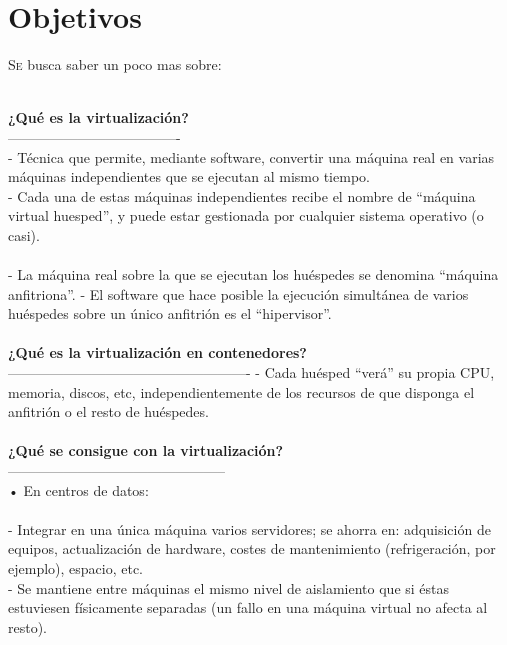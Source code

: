 \documentclass[twoside,twocolumn]{article}
\begin{document}
\section{Objetivos}
\begin{flushright}
\begin{itemize}
\lettrine[nindent=0em,lines=2]{S}e busca saber un poco mas sobre:

\textbf{}\\
\textbf{¿Qué es la virtualización?}\\
-------------------------------------
\textbf{}\\
- Técnica que permite, mediante software, convertir una máquina
real en varias máquinas independientes que se ejecutan al mismo
tiempo.\textbf{}\\
- Cada una de estas máquinas independientes recibe el nombre de
“máquina virtual huesped”, y puede estar gestionada por
cualquier sistema operativo (o casi).\textbf{}\\
\textbf{}\\
- La máquina real sobre la que se ejecutan los huéspedes se
denomina “máquina anfitriona”.
- El software que hace posible la ejecución simultánea de varios
huéspedes sobre un único anfitrión es el “hipervisor”.
\textbf{}\\
\textbf{}\\
\textbf{¿Qué es la virtualización en contenedores?}\\
----------------------------------------------------
- Cada huésped “verá” su propia CPU, memoria, discos, etc,
independientemente de los recursos de que disponga el anfitrión
o el resto de huéspedes.
\textbf{}\\
\textbf{}\\
\textbf{¿Qué se consigue con la virtualización?}\\
-----------------------------------------------
\textbf{}\\
• En centros de datos:\textbf{}\\
\textbf{}\\
- Integrar en una única máquina varios servidores; se ahorra en:
adquisición de equipos, actualización de hardware, costes de
mantenimiento (refrigeración, por ejemplo), espacio, etc.
\textbf{}\\
- Se mantiene entre máquinas el mismo nivel de aislamiento que si
éstas estuviesen físicamente separadas (un fallo en una máquina
virtual no afecta al resto).
\textbf{}\\
\textbf{}\\

\end{itemize}
\end{flushright}
\end{document}
